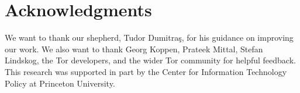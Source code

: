 \section*{Acknowledgments}
We want to thank our shepherd, Tudor Dumitra\c{s}, for his guidance on
improving our work.  We also want to thank Georg Koppen, Prateek Mittal, Stefan
Lindskog, the Tor developers, and the wider Tor community for helpful feedback.
This research was supported in part by the Center for Information Technology
Policy at Princeton University.
